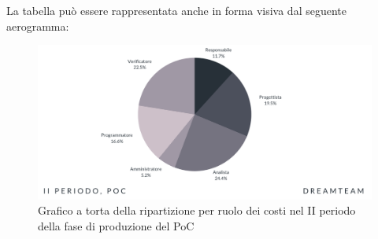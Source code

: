 La tabella può essere rappresentata anche in forma visiva dal seguente aerogramma:
\begin{figure}[H]
\centering
\includegraphics[scale=0.65]{Sezioni/SezioniPreventivo/grafici/Poc_II_periodo_costi.png}
\caption{Grafico a torta della ripartizione per ruolo dei costi nel II periodo della fase di produzione del PoC}
\end{figure}



